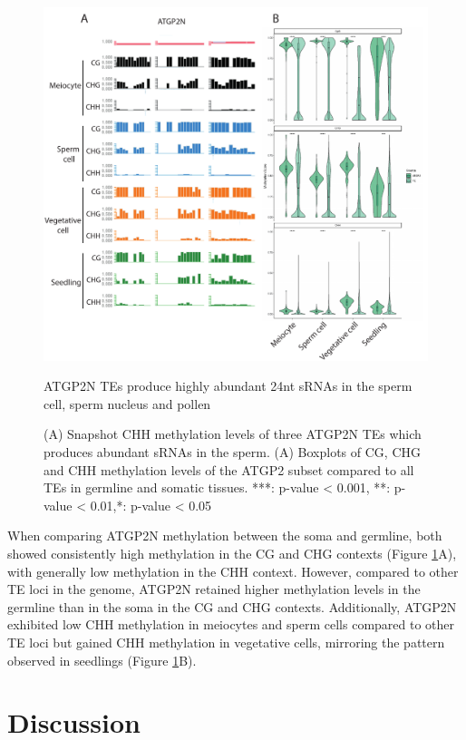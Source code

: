 \begin{figure}[htbp!] 
\centering    
    \includegraphics[width=1\textwidth]{Chapter2/Figs/Figure14_TE_methylation.pdf}
\caption{ATGP2N TEs produce highly abundant 24nt sRNAs in the sperm cell, sperm nucleus and pollen}
\label{fig:TE_methylation}
\captionsetup{font=small}
    \caption*{(A) Snapshot CHH methylation levels of three ATGP2N TEs which produces abundant sRNAs in the sperm. (A) Boxplots of CG, CHG and CHH methylation levels of the ATGP2 subset compared to all TEs in germline and somatic tissues. ***: p-value < 0.001, **: p-value < 0.01,*: p-value < 0.05}
\end{figure}

When comparing ATGP2N methylation between the soma and germline, both showed consistently high methylation in the CG and CHG contexts (Figure \ref{fig:TE_methylation}A), with generally low methylation in the CHH context. However, compared to other TE loci in the genome, ATGP2N retained higher methylation levels in the germline than in the soma in the CG and CHG contexts. Additionally, ATGP2N exhibited low CHH methylation in meiocytes and sperm cells compared to other TE loci but gained CHH methylation in vegetative cells, mirroring the pattern observed in seedlings (Figure \ref{fig:TE_methylation}B).

\clearpage

\section{Discussion}

